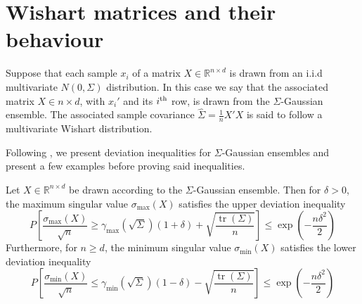 \documentclass[10pt,handout,english]{beamer}
\DeclareMathOperator{\tr}{tr}
\newcommand{\ts}{\textsuperscript}
\newcommand{\R}{\mathbb{R}}
\begin{document}
\section{Wishart matrices and their behaviour}
\frame{\tableofcontents[currentsection]}

\begin{frame}
\begin{definition}
Suppose that each sample $x_i$ of a matrix $X\in\R^{n\times d}$ is drawn from an i.i.d multivariate $N(0,\Sigma)$ distribution. In this case we say that the associated matrix $X\in n\times d$, with $x_i'$ and its $i\ts{th}$ row, is drawn from the $\Sigma$-Gaussian ensemble. The associated sample covariance $\hat{\Sigma}=\frac{1}{n}X'X$ is said to follow a multivariate Wishart distribution.
\end{definition}
Following \citet{wainwright2019high}, we present deviation inequalities for $\Sigma$-Gaussian ensembles and present a few examples before proving said inequalities.
\end{frame}
\begin{frame}
\begin{theorem}
Let $X\in\R^{n\times d}$ be drawn according to the $\Sigma$-Gaussian ensemble. Then for $\delta>0$, the maximum singular value $\sigma_{\max}(X)$ satisfies the upper deviation inequality
\[
P\left[\frac{\sigma_{\max}(X)}{\sqrt{n}}\geq \gamma_{\max}(\sqrt{\Sigma})(1+\delta)+\sqrt{\frac{\tr(\Sigma)}{n}}\right]\leq\exp\left(-\frac{n\delta^2}{2}\right)
\]
Furthermore, for $n\geq d$, the minimum singular value $\sigma_{\min}(X)$ satisfies the lower deviation inequality
\[
P\left[\frac{\sigma_{\min}(X)}{\sqrt{n}}\leq \gamma_{\min}(\sqrt{\Sigma})(1-\delta)-\sqrt{\frac{\tr(\Sigma)}{n}}\right]\leq\exp\left(-\frac{n\delta^2}{2}\right)
\]
\end{theorem} 
\end{frame}
\end{document}
